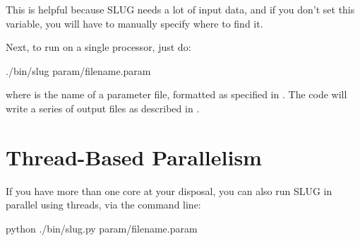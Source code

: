 \documentclass[letterpaper,10pt,english]{sphinxmanual}
\begin{document}
This is helpful because SLUG needs a lot of input data, and if you don’t set this variable, you will have to manually specify where to find it.

Next, to run on a single processor, just do:

\begin{sphinxVerbatim}[commandchars=\\\{\}]
./bin/slug param/filename.param
\end{sphinxVerbatim}

where  is the name of a parameter file, formatted as specified in {\hyperref[\detokenize{parameters:sec-parameters}]{}}. The code will write a series of output files as described in {\hyperref[\detokenize{output:sec-output}]{}}.


\section{Thread-Based Parallelism}
\label{\detokenize{running:thread-based-parallelism}}
If you have more than one core at your disposal, you can also run SLUG in parallel using threads, via the command line:

\begin{sphinxVerbatim}[commandchars=\\\{\}]
python ./bin/slug.py param/filename.param
\end{sphinxVerbatim}
\end{document}
